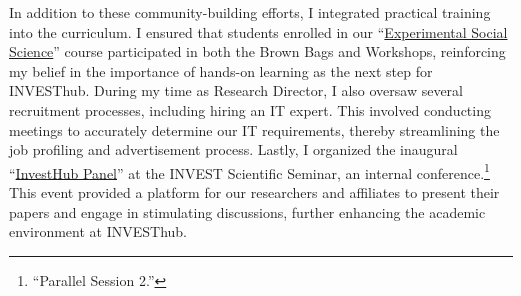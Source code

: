 \documentclass[10pt,stdletter,dateno,sigleft]{newlfm} %
\begin{document}
\begin{newlfm}
In addition to these community-building efforts, I integrated practical training into the curriculum. I ensured that students enrolled in our ``\href{https://github.com/hbahamonde/Exp_Soc_Science/raw/main/Bahamonde_Exp_Soc_Sci.pdf}{Experimental Social Science}'' course participated in both the Brown Bags and Workshops, reinforcing my belief in the importance of hands-on learning as the next step for INVESThub. During my time as Research Director, I also oversaw several recruitment processes, including hiring an IT expert. This involved conducting meetings to accurately determine our IT requirements, thereby streamlining the job profiling and advertisement process. Lastly, I organized the inaugural ``\href{https://invest.utu.fi/wp-content/uploads/2022/10/Scientific-Seminar-VII-Programme.pdf}{InvestHub Panel}'' at the INVEST Scientific Seminar, an internal conference.\footnote{``Parallel Session 2.''} This event provided a platform for our researchers and affiliates to present their papers and engage in stimulating discussions, further enhancing the academic environment at INVESThub.


\end{newlfm}
\end{document}

